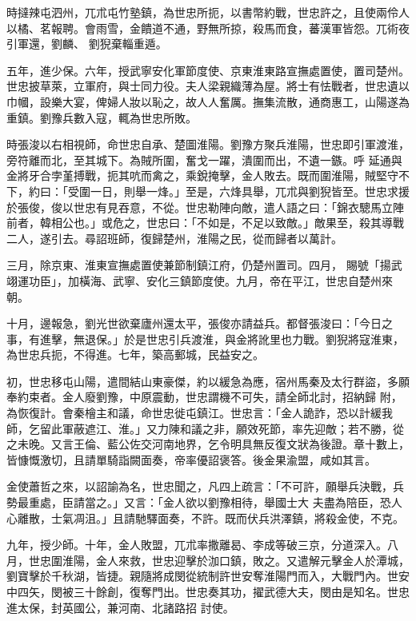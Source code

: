 \begin{pinyinscope}
 時撻辣屯泗州，兀朮屯竹塾鎮，為世忠所扼，以書幣約戰，世忠許之，且使兩伶人以橘、茗報聘。會雨雪，金饋道不通，野無所掠，殺馬而食，蕃漢軍皆怨。兀術夜引軍還，劉麟、
 劉猊棄輜重遁。



 五年，進少保。六年，授武寧安化軍節度使、京東淮東路宣撫處置使，置司楚州。世忠披草萊，立軍府，與士同力役。夫人梁親織薄為屋。將士有怯戰者，世忠遺以巾幗，設樂大宴，俾婦人妝以恥之，故人人奮厲。撫集流散，通商惠工，山陽遂為重鎮。劉豫兵數入寇，輒為世忠所敗。



 時張浚以右相視師，命世忠自承、楚圖淮陽。劉豫方聚兵淮陽，世忠即引軍渡淮，旁符離而北，至其城下。為賊所圍，奮戈一躍，潰圍而出，不遺一鏃。呼
 延通與金將牙合孛堇搏戰，扼其吭而禽之，乘銳掩擊，金人敗去。既而圍淮陽，賊堅守不下，約曰：「受圍一日，則舉一烽。」至是，六烽具舉，兀朮與劉猊皆至。世忠求援於張俊，俊以世忠有見吞意，不從。世忠勒陣向敵，遣人語之曰：「錦衣驄馬立陣前者，韓相公也。」或危之，世忠曰：「不如是，不足以致敵。」敵果至，殺其導戰二人，遂引去。尋詔班師，復歸楚州，淮陽之民，從而歸者以萬計。



 三月，除京東、淮東宣撫處置使兼節制鎮江府，仍楚州置司。四月，
 賜號「揚武翊運功臣」，加橫海、武寧、安化三鎮節度使。九月，帝在平江，世忠自楚州來朝。



 十月，邊報急，劉光世欲棄廬州還太平，張俊亦請益兵。都督張浚曰：「今日之事，有進擊，無退保。」於是世忠引兵渡淮，與金將訛里也力戰。劉猊將寇淮東，為世忠兵扼，不得進。七年，築高郵城，民益安之。



 初，世忠移屯山陽，遣間結山東豪傑，約以緩急為應，宿州馬秦及太行群盜，多願奉約束者。金人廢劉豫，中原震動，世忠謂機不可失，請全師北討，招納歸
 附，為恢復計。會秦檜主和議，命世忠徙屯鎮江。世忠言：「金人詭詐，恐以計緩我師，乞留此軍蔽遮江、淮。」又力陳和議之非，願效死節，率先迎敵；若不勝，從之未晚。又言王倫、藍公佐交河南地界，乞令明具無反復文狀為後證。章十數上，皆慷慨激切，且請單騎詣闕面奏，帝率優詔褒答。後金果渝盟，咸如其言。



 金使蕭哲之來，以詔諭為名，世忠聞之，凡四上疏言：「不可許，願舉兵決戰，兵勢最重處，臣請當之。」又言：「金人欲以劉豫相待，舉國士大
 夫盡為陪臣，恐人心離散，士氣凋沮。」且請馳驛面奏，不許。既而伏兵洪澤鎮，將殺金使，不克。



 九年，授少師。十年，金人敗盟，兀朮率撒離曷、李成等破三京，分道深入。八月，世忠圍淮陽，金人來救，世忠迎擊於泇口鎮，敗之。又遣解元擊金人於潭城，劉寶擊於千秋湖，皆捷。親隨將成閔從統制許世安奪淮陽門而入，大戰門內。世安中四矢，閔被三十餘創，復奪門出。世忠奏其功，擢武德大夫，閔由是知名。世忠進太保，封英國公，兼河南、北諸路招
 討使。




\end{pinyinscope}
